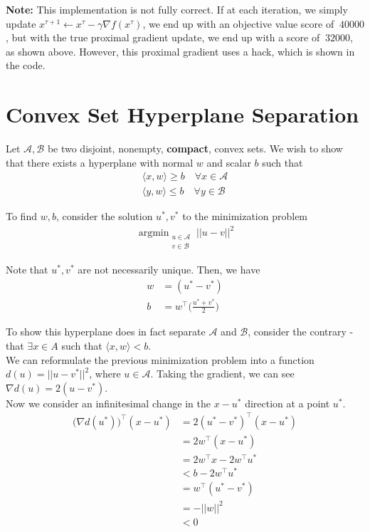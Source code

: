 \documentclass[a4paper]{article}
\DeclareMathOperator*{\argmin}{argmin}
\begin{document}
\textbf{Note:} This implementation is not fully correct. If at each iteration, we simply update $x^{\tau + 1} \leftarrow x^\tau - \gamma \nabla f(x^\tau)$, we end up with an objective value score of $~40000$, but with the true proximal gradient update, we end up with a score of $~32000$, as shown above. However, this proximal gradient uses a hack, which is shown in the code.

\pagebreak

\section{Convex Set Hyperplane Separation}

Let $\mathcal{A}, \mathcal{B}$ be two disjoint, nonempty, \textbf{compact}, convex sets. We wish to show that there exists a hyperplane with normal $w$ and scalar $b$ such that
\begin{align}
\langle x, w \rangle \geq b \quad \forall x \in \mathcal{A} \\
\langle y, w \rangle \leq b \quad \forall y \in \mathcal{B}
\end{align}

To find $w, b$, consider the solution $u^*, v^*$ to the minimization problem
\begin{align}
\argmin_{\substack{u \in \mathcal{A} \\ v \in \mathcal{B}}} ||u - v||^2
\end{align}

Note that $u^*, v^*$ are not necessarily unique. Then, we have
\begin{align}
    w &= (u^* - v^*) \\
    b &= w^\intercal \Big( \frac{u^* + v^*}{2}  \Big)
\end{align}

To show this hyperplane does in fact separate $\mathcal{A}$ and $\mathcal{B}$, consider the contrary - that $\exists x \in A$ such that $\langle x, w \rangle < b$. \\

We can reformulate the previous minimization problem into a function $d(u) = ||u - v^*||^2$, where $u \in \mathcal{A}$. Taking the gradient, we can see $\nabla d(u) = 2 (u - v^*)$. \\

Now we consider an infinitesimal change in the $x - u^*$ direction at a point $u^*$.
\begin{align}
\Big( \nabla d(u^*) \Big)^\intercal (x - u^*) &= 2 (u^* - v^*)^\intercal (x - u^*) \nonumber\\
&= 2 w^\intercal (x - u^*) \nonumber\\
&= 2 w^\intercal x - 2 w^\intercal u^* \nonumber\\
&< b - 2 w^\intercal u^* \nonumber\\
&= w^\intercal (u^* - v^*) \nonumber\\
&= - ||w||^2 \nonumber\\
&< 0 \nonumber
\end{align}
\end{document}
